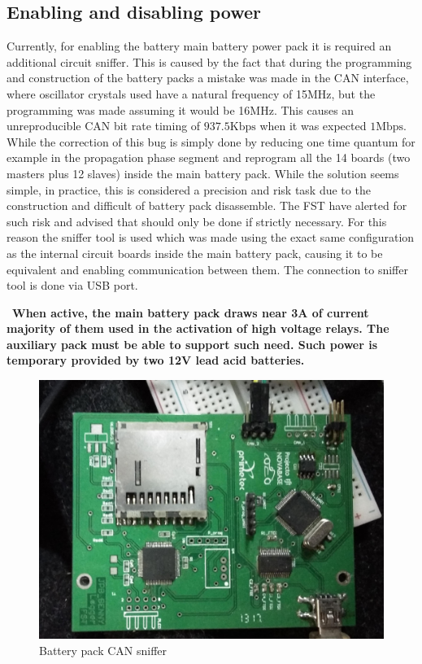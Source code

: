 \subsection{Enabling and disabling power}
Currently, for enabling the battery main battery power pack it is required an additional circuit sniffer. This is caused by the fact that during the programming and construction of the battery packs a mistake was made in the \gls{CAN} interface, where oscillator crystals used have a natural frequency of 15MHz, but the programming was made assuming it would be 16MHz. This causes an unreproducible CAN bit rate timing of $937.5\text{Kbps}$ when it was expected $1\text{Mbps}$. While the correction of this bug is simply done by reducing one time quantum for example in the propagation phase segment and reprogram all the 14 boards (two masters plus 12 slaves) inside the main battery pack. While the solution seems simple, in practice, this is considered a precision and risk task due to the construction and difficult of battery pack disassemble. The \gls{FST} have alerted for such risk and advised that should only be done if strictly necessary. For this reason the sniffer tool is used which was made using the exact same configuration as the internal circuit boards inside the main battery pack, causing it to be equivalent and enabling communication between them.
The connection to sniffer tool is done via USB port.

\begin{mdframed}[backgroundcolor=red!20, roundcorner=10pt, innertopmargin=5pt, innerbottommargin=5pt, skipabove=5pt]
	\Warning \, \textbf{When active, the main battery pack draws near 3A of current majority of them used in the activation of high voltage relays. The auxiliary pack must be able to support such need. Such power is temporary provided by two 12V lead acid batteries.}
\end{mdframed}

\begin{figure}[!hb]
	\centering
	\includegraphics[width=0.5\linewidth]{figures/battery_pack_can_sniffer}
	\caption{Battery pack CAN sniffer}
	\label{fig:battery_can_sniffer}
\end{figure}


